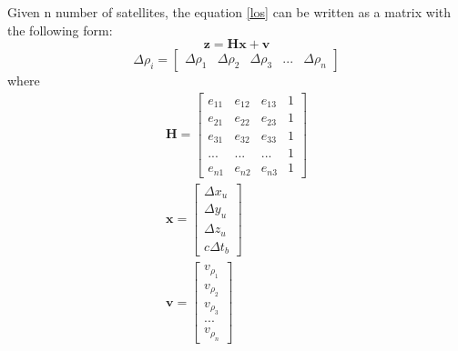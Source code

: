 Given n number of satellites, the equation \eqref{los} can be written as a matrix with the following form:
\begin{equation}
	\textbf{z} = \textbf{Hx}+ \textbf{v}
\end{equation}
\begin{equation}
	\Delta \rho _i = \begin{bmatrix}
		\Delta \rho_1 &  \Delta \rho_2 &  \Delta \rho_3 & ... & \Delta \rho_n
	\end{bmatrix} 
\end{equation}
where 
\begin{subequations}
	\begin{align}
		\textbf{H} = \begin{bmatrix}
			e_{11} & e_{12} & e_{13}& 1 \\
			e_{21} & e_{22} & e_{23}& 1 
			\\
			e_{31} & e_{32} & e_{33}& 1
			\\
			... & ... & ... &  1 
			\\
			e_{n1} & e_{n2} & e_{n3} & 1
		\end{bmatrix}\\
		\textbf{x} = \begin{bmatrix}
			\Delta x_u \\ \Delta y_u \\\Delta z_u \\ c\Delta t_b
		\end{bmatrix}\\
		\textbf{v} = \begin{bmatrix}
			v_{\rho_1}\\
			v_{\rho_2}\\
			v_{\rho_3}\\
			...\\
			v_{\rho_n}
		\end{bmatrix}
	\end{align}
\end{subequations}

